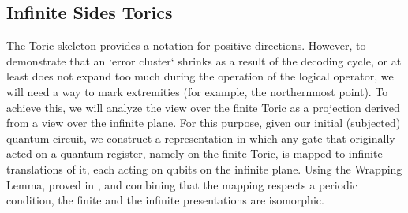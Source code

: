 \subsection{Infinite Sides Torics}
\label{subsection:infinitetoric}
The Toric skeleton provides a notation for positive directions. However, to demonstrate that an `error cluster` shrinks as a result of the decoding cycle, or at least does not expand too much during the operation of the logical operator, we will need a way to mark extremities (for example, the northernmost point). To achieve this, we will analyze the view over the finite Toric as a projection derived from a view over the infinite plane. For this purpose, given our initial (subjected) quantum circuit, we construct a representation in which any gate that originally acted on a quantum register, namely on the finite Toric, is mapped to infinite translations of it, each acting on qubits on the infinite plane. Using the Wrapping Lemma, proved in \cite{schumacher2004reversiblequantumcellularautomata}, and combining that the mapping respects a periodic condition, the finite and the infinite presentations are isomorphic.




